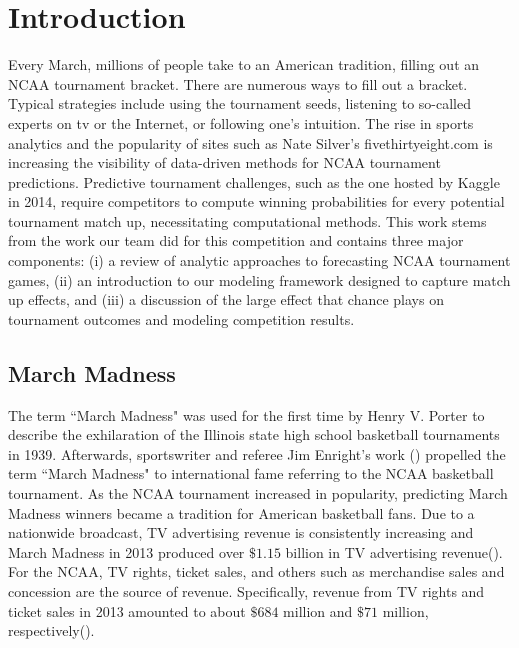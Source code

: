 \section{Introduction}
Every March, millions of people take to an American tradition, filling out an NCAA tournament bracket. There are numerous ways to fill out a bracket. Typical strategies include using the tournament seeds, listening to so-called experts on tv or the Internet, or following one's intuition. The rise in sports analytics and the popularity of sites such as Nate Silver's fivethirtyeight.com is increasing the visibility of data-driven methods for NCAA tournament predictions. Predictive tournament challenges, such as the one hosted by Kaggle in 2014, require competitors to compute winning probabilities for every potential tournament match up, necessitating computational methods. This work stems from the work our team did for this competition and contains three major components: (i) a review of analytic approaches to forecasting NCAA tournament games, (ii) an introduction to our modeling framework designed to capture match up effects, and (iii) a discussion of the large effect that chance plays on tournament outcomes and modeling competition results.


\subsection{March Madness}
The term ``March Madness" was used for the first time by Henry V. Porter to describe the exhilaration of the Illinois state high school basketball tournaments in 1939.  Afterwards, sportswriter and referee Jim Enright's work (\cite{enright1977march}) propelled the term ``March Madness" to international fame referring to the NCAA basketball tournament. As the NCAA  tournament increased in popularity, predicting March Madness winners became a tradition for American basketball fans. Due to a nationwide broadcast, TV advertising revenue is consistently increasing and March Madness in 2013 produced over $\$ 1.15$ billion in TV advertising revenue(\cite{Kantar2014}). For the NCAA, TV rights, ticket sales, and others such as merchandise sales and concession are the source of revenue. Specifically, revenue from TV rights and ticket sales in 2013 amounted to about $\$ 684$ million and $\$ 71$ million, respectively(\cite{NCAA2014}).

